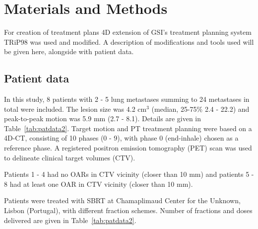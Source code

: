 \section{Materials and Methods}

For creation of treatment plans 4D extension of GSI's treatment planning system TRiP98 \cite{Kraemer2000a, Richter2013} was used and modified. A description of modifications and tools used will be given here, 
alongside with patient data.

\subsection{Patient data}


In this study, 8 patients with 2 - 5 lung metastases summing to 24 metastases in total were included. The lesion size was 4.2 cm$^3$ (median, 25-75\% 2.4 - 22.2) and peak-to-peak motion was 5.9 mm (2.7 - 8.1). 
Details are given in Table~\ref{tab:patdata2}.
Target motion and PT treatment planning were based on a 4D-CT, consisting of 10 phases (0 - 9), with phase 0 (end-inhale) chosen as a reference phase.
A registered positron emission tomography (PET) scan was used to delineate clinical target volumes (CTV). 

Patients 1 - 4 had no OARs in CTV vicinity (closer than 10 mm) and patients 5 - 8 had at least one OAR in CTV vicinity (closer than 10 mm).

Patients were treated with SBRT at Chamaplimaud Center for the Unknown, Lisbon (Portugal), with different fraction schemes. Number of fractions and doses delivered are given in Table~\ref{tab:patdata2}. 

\newpage

